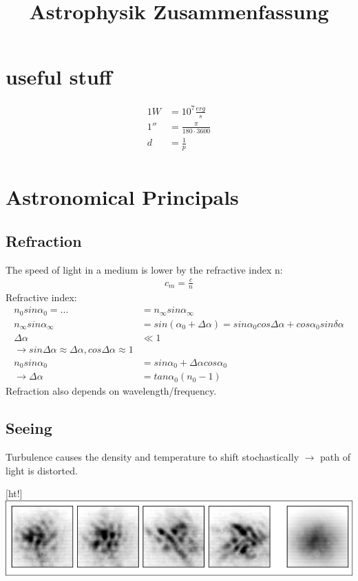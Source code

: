 \documentclass[11pt,a4paper]{article}
\begin{document}
\title{Astrophysik Zusammenfassung}

\author{}

\date{}

\maketitle

\tableofcontents

\newpage


\section{useful stuff}
\begin{align*}
    1 W &= 10^7 \frac {erg} s \\
    1'' &= \frac \pi {180 \cdot 3600}\\ 
    d &= \frac 1 p \\
\end{align*}
\section{Astronomical Principals}
\subsection{Refraction}
The speed of light in a medium is lower by the refractive index n:
\begin{align*}
   c_m = \frac c n 
\end{align*}
Refractive index: 
\begin{align*}
    n_0 sin \alpha_0 = ... &= n_\infty sin \alpha_\infty \\ 
    n_\infty sin \alpha_\infty &= sin (\alpha_0 + \Delta \alpha) = sin \alpha_0 cos \Delta \alpha + cos \alpha_0 sin \delta \alpha\\ 
    \Delta \alpha &\ll 1  \\ 
    \rightarrow sin \Delta \alpha \approx \Delta \alpha, cos \Delta \alpha \approx 1 \\ 
    n_0 sin \alpha_0 &= sin \alpha_0 + \Delta \alpha cos \alpha_0 \\ 
    \rightarrow \Delta \alpha &= tan \alpha_0 (n_0 - 1)
\end{align*}
Refraction also depends on wavelength/frequency.
\subsection{Seeing}
Turbulence causes the density and temperature to shift stochastically $\rightarrow$ path of light is distorted.
\begin{center}[ht!]
    \includegraphics[width=\linewidth]{screenshot_2024-01-12-192223.png}
\end{center}
\end{document}
